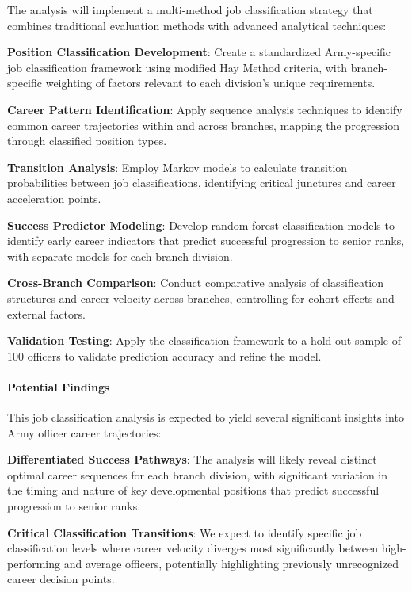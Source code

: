 \documentclass[./main.tex]{subfiles}
\begin{document}
The analysis will implement a multi-method job classification strategy
that combines traditional evaluation methods with advanced analytical
techniques:

\textbf{Position Classification Development}: Create a standardized
Army-specific job classification framework using modified Hay Method
criteria, with branch-specific weighting of factors relevant to each
division's unique requirements.

\textbf{Career Pattern Identification}: Apply sequence analysis
techniques to identify common career trajectories within and across
branches, mapping the progression through classified position types.

\textbf{Transition Analysis}: Employ Markov models to calculate
transition probabilities between job classifications, identifying
critical junctures and career acceleration points.

\textbf{Success Predictor Modeling}: Develop random forest
classification models to identify early career indicators that predict
successful progression to senior ranks, with separate models for each
branch division.

\textbf{Cross-Branch Comparison}: Conduct comparative analysis of
classification structures and career velocity across branches,
controlling for cohort effects and external factors.

\textbf{Validation Testing}: Apply the classification framework to a
hold-out sample of 100 officers to validate prediction accuracy and
refine the model.

\paragraph{Potential Findings}\label{potential-findings}

This job classification analysis is expected to yield several
significant insights into Army officer career trajectories:

\textbf{Differentiated Success Pathways}: The analysis will likely
reveal distinct optimal career sequences for each branch division, with
significant variation in the timing and nature of key developmental
positions that predict successful progression to senior ranks.

\textbf{Critical Classification Transitions}: We expect to identify
specific job classification levels where career velocity diverges most
significantly between high-performing and average officers, potentially
highlighting previously unrecognized career decision points.
\end{document}
